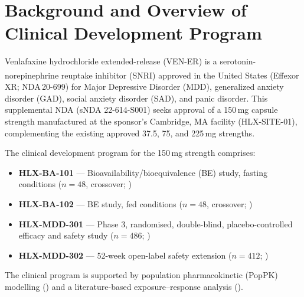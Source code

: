 \section{Background and Overview of Clinical Development Program}
\label{sec:background}

Venlafaxine hydrochloride extended-release (VEN-ER) is a serotonin-norepinephrine reuptake
inhibitor (SNRI) approved in the United States (Effexor\textsuperscript{\textregistered} XR;
NDA\,20-699) for Major Depressive Disorder (MDD), generalized anxiety disorder (GAD), social
anxiety disorder (SAD), and panic disorder. This supplemental NDA (sNDA 22-614-S001) seeks
approval of a 150\,mg capsule strength manufactured at the sponsor's Cambridge, MA facility
(HLX-SITE-01), complementing the existing approved 37.5, 75, and 225\,mg strengths.

The clinical development program for the 150\,mg strength comprises:

\begin{itemize}[leftmargin=18pt, itemsep=2pt]
  \item \textbf{HLX-BA-101} --- Bioavailability/bioequivalence (BE) study, fasting conditions
        ($n=48$, crossover; )
  \item \textbf{HLX-BA-102} --- BE study, fed conditions ($n=48$, crossover;
        )
  \item \textbf{HLX-MDD-301} --- Phase 3, randomised, double-blind, placebo-controlled efficacy
        and safety study ($n=486$;
        )
  \item \textbf{HLX-MDD-302} --- 52-week open-label safety extension ($n=412$;
        )
\end{itemize}

The clinical program is supported by population pharmacokinetic (PopPK) modelling
() and a literature-based exposure--response
analysis ().


